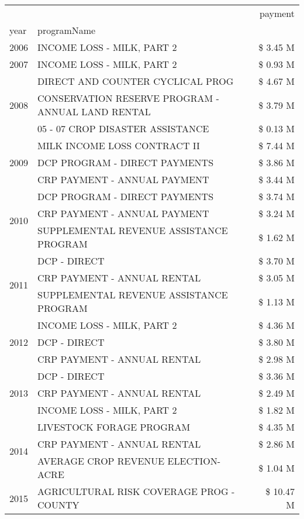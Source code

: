 \begin{tabular}{llr}
\toprule
 &  & payment \\
year & programName &  \\
\midrule
2006 & INCOME LOSS - MILK, PART 2 & \$ 3.45 M \\
\cline{1-3}
2007 & INCOME LOSS - MILK, PART 2 & \$ 0.93 M \\
\cline{1-3}
\multirow[t]{3}{*}{2008} & DIRECT AND COUNTER CYCLICAL PROG & \$ 4.67 M \\
 & CONSERVATION RESERVE PROGRAM - ANNUAL LAND RENTAL & \$ 3.79 M \\
 & 05 - 07 CROP DISASTER ASSISTANCE & \$ 0.13 M \\
\cline{1-3}
\multirow[t]{3}{*}{2009} & MILK INCOME LOSS CONTRACT II & \$ 7.44 M \\
 & DCP PROGRAM - DIRECT PAYMENTS & \$ 3.86 M \\
 & CRP PAYMENT - ANNUAL PAYMENT & \$ 3.44 M \\
\cline{1-3}
\multirow[t]{3}{*}{2010} & DCP PROGRAM - DIRECT PAYMENTS & \$ 3.74 M \\
 & CRP PAYMENT - ANNUAL PAYMENT & \$ 3.24 M \\
 & SUPPLEMENTAL REVENUE ASSISTANCE PROGRAM & \$ 1.62 M \\
\cline{1-3}
\multirow[t]{3}{*}{2011} & DCP - DIRECT & \$ 3.70 M \\
 & CRP PAYMENT - ANNUAL RENTAL & \$ 3.05 M \\
 & SUPPLEMENTAL REVENUE ASSISTANCE PROGRAM & \$ 1.13 M \\
\cline{1-3}
\multirow[t]{3}{*}{2012} & INCOME LOSS - MILK, PART 2 & \$ 4.36 M \\
 & DCP - DIRECT & \$ 3.80 M \\
 & CRP PAYMENT - ANNUAL RENTAL & \$ 2.98 M \\
\cline{1-3}
\multirow[t]{3}{*}{2013} & DCP - DIRECT & \$ 3.36 M \\
 & CRP PAYMENT - ANNUAL RENTAL & \$ 2.49 M \\
 & INCOME LOSS - MILK, PART 2 & \$ 1.82 M \\
\cline{1-3}
\multirow[t]{3}{*}{2014} & LIVESTOCK FORAGE PROGRAM & \$ 4.35 M \\
 & CRP PAYMENT - ANNUAL RENTAL & \$ 2.86 M \\
 & AVERAGE CROP REVENUE ELECTION-ACRE & \$ 1.04 M \\
\cline{1-3}
\multirow[t]{3}{*}{2015} & AGRICULTURAL RISK COVERAGE PROG - COUNTY & \$ 10.47 M \\

\end{tabular}

